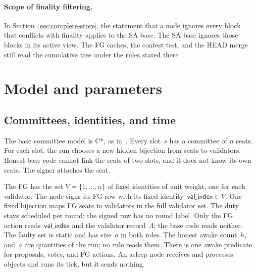 \documentclass{article}
\theoremstyle{plain}
\theoremstyle{definition}
\theoremstyle{remark}
\newcommand{\valindex}{\mathsf{val\_index}}
\newcommand{\SAS}{\cite{SAS}}
\begin{document}
\paragraph{Scope of finality filtering.}
In Section~\ref{sec:complete-store}, the statement that a node ignores
every block that conflicts with finality applies to the SA base.
The SA base ignores those blocks in its active view.  The FG caches,
the contest test, and the HEAD merge still read the cumulative tree
under the rules stated there~\cite[\S2]{FB}.

\section{Model and parameters}\label{sec:model}

\subsection{Committees, identities, and time}\label{sec:committees}

The base committee model is C*, as in~\SAS.  Every slot~$s$ has a
committee of $n$ seats.  For each slot, the run chooses a new hidden
bijection from seats to validators.  Honest base code cannot link the
seats of two slots, and it does not know its own seats.  The signer
attaches the seat.

The FG has the set $V=\{1,\dots,n\}$ of fixed identities of unit
weight, one for each validator.  The node signs its FG row with its
fixed identity~$\valindex\in V$.  One fixed bijection maps FG seats to
validators in the full validator set.  The duty stays scheduled per round;
the signed row has no round label.  Only the FG action reads~$\valindex$
and the validator record~$\Lambda$; the base code reads neither.  The
faulty set is static and has size~$a$ in both roles.  The honest awake
count~$h_t$ and~$a$ are quantities of the run; no rule reads them.
There is one awake predicate for proposals, votes, and FG actions.  An
asleep node receives and processes objects and runs its tick, but it
sends nothing.
\end{document}
